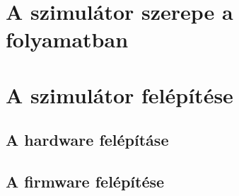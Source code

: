 \section{A szimulátor szerepe a folyamatban}
\section{A szimulátor felépítése}
\subsection{A hardware felépításe}
\subsection{A firmware felépítése}